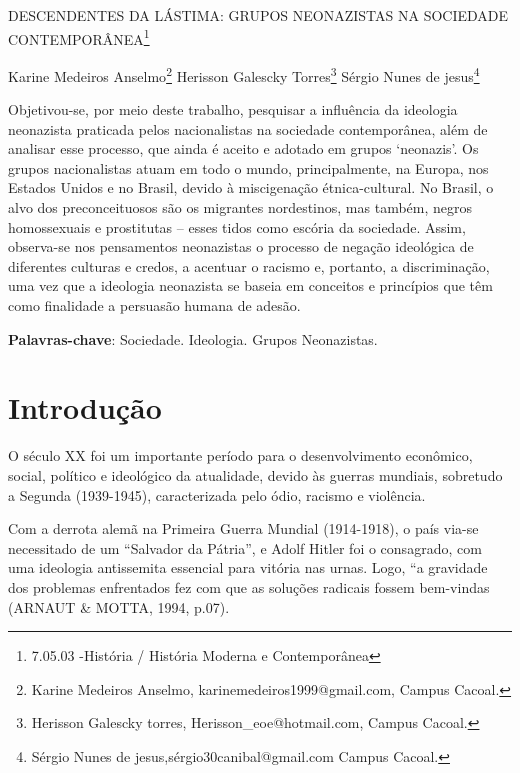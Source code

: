 \documentclass[article,12pt,onesidea,4paper,english,brazil]{abntex2}
\begin{document}
	
	
	\frenchspacing 
	
	\begin{center}
		\LARGE DESCENDENTES DA LÁSTIMA:
		GRUPOS NEONAZISTAS NA SOCIEDADE CONTEMPORÂNEA\footnote{ 7.05.03 -História / História Moderna e Contemporânea}
		
		\normalsize
	Karine Medeiros Anselmo\footnote{Karine Medeiros Anselmo, karinemedeiros1999@gmail.com, Campus Cacoal.} 
	Herisson Galescky Torres\footnote{Herisson Galescky torres, Herisson\_eoe@hotmail.com, Campus Cacoal.} 
	Sérgio Nunes de jesus\footnote{Sérgio Nunes de jesus,sérgio30canibal@gmail.com Campus Cacoal.} 
	\end{center}
	
	\begin{resumoumacoluna}
		Objetivou-se, por meio deste trabalho, pesquisar a influência da ideologia neonazista praticada pelos nacionalistas na sociedade contemporânea, além de analisar esse processo, que ainda é aceito e adotado em grupos ‘neonazis’. Os grupos nacionalistas atuam em todo o mundo, principalmente, na Europa, nos Estados Unidos e no Brasil, devido à miscigenação étnica-cultural. No Brasil, o alvo dos preconceituosos são os migrantes nordestinos, mas também, negros homossexuais e prostitutas – esses tidos como escória da sociedade. Assim, observa-se nos pensamentos neonazistas o processo de negação ideológica de diferentes culturas e credos, a acentuar o racismo e, portanto, a discriminação, uma vez que a ideologia neonazista se baseia em conceitos e princípios que têm como finalidade a persuasão humana de adesão.
		
		\vspace{\onelineskip}
		
		\noindent
		\textbf{Palavras-chave}: Sociedade. Ideologia. Grupos Neonazistas.
	\end{resumoumacoluna}
	
	\section*{Introdução}
	
O século XX foi um importante período para o desenvolvimento econômico, social, político e ideológico da atualidade, devido às guerras mundiais, sobretudo a Segunda (1939-1945), caracterizada pelo ódio, racismo e violência.

Com a derrota alemã na Primeira Guerra Mundial (1914-1918), o país via-se necessitado de um “Salvador da Pátria”, e Adolf Hitler foi o consagrado, com uma ideologia antissemita essencial para vitória nas urnas. Logo, “a gravidade dos problemas enfrentados fez com que as soluções radicais fossem bem-vindas (ARNAUT \& MOTTA, 1994, p.07).
\end{document}
